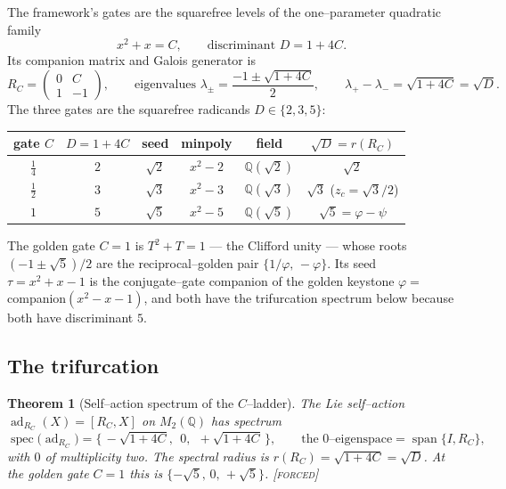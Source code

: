 \documentclass[11pt]{article}
\theoremstyle{plain}
\newtheorem{theorem}{Theorem}[section]
\theoremstyle{definition}
\theoremstyle{remark}
\newcommand{\forced}{\textcolor{forcedc}{\textsc{[forced]}}}
\newcommand{\Q}{\mathbb{Q}}
\begin{document}
The framework's gates are the squarefree levels of the one--parameter quadratic family
\begin{equation}\label{eq:gengate}
x^2 + x = C, \qquad \text{discriminant } D = 1+4C .
\end{equation}
Its companion matrix and Galois generator is
\begin{equation}\label{eq:companion}
R_C = \begin{pmatrix} 0 & C \\ 1 & -1 \end{pmatrix}, \qquad \text{eigenvalues } \lambda_\pm = \frac{-1\pm\sqrt{1+4C}}{2}, \qquad \lambda_+ - \lambda_- = \sqrt{1+4C}=\sqrt D .
\end{equation}
The three gates are the squarefree radicands $D\in\{2,3,5\}$:

\begin{center}
\renewcommand{\arraystretch}{1.3}
\begin{tabular}{@{}cccccc@{}}
\toprule
gate $C$ & $D=1+4C$ & seed & minpoly & field & $\sqrt D = r(R_C)$ \\
\midrule
$\tfrac14$ & $2$ & $\sqrt2$ & $x^2-2$ & $\Q(\sqrt2)$ & $\sqrt2$ \\
$\tfrac12$ & $3$ & $\sqrt3$ & $x^2-3$ & $\Q(\sqrt3)$ & $\sqrt3$ \quad ($z_c=\sqrt3/2$) \\
$1$ & $5$ & $\sqrt5$ & $x^2-5$ & $\Q(\sqrt5)$ & $\sqrt5 = \varphi-\psi$ \\
\bottomrule
\end{tabular}
\end{center}

\noindent The golden gate $C=1$ is $T^2+T=1$ --- the Clifford unity --- whose roots $(-1\pm\sqrt5)/2$ are the reciprocal--golden pair $\{1/\varphi,\,-\varphi\}$. Its seed $\tau = x^2+x-1$ is the conjugate--gate companion of the golden keystone $\varphi=\,$companion$(x^2-x-1)$, and both have the trifurcation spectrum below because both have discriminant $5$.

\subsection{The trifurcation}

\begin{theorem}[Self--action spectrum of the $C$--ladder]\label{prop:trifurcation}
The Lie self--action $\operatorname{ad}_{R_C}(X) = [R_C, X]$ on $M_2(\Q)$ has spectrum
\begin{equation}\label{eq:trifurcation}
\operatorname{spec}\bigl(\operatorname{ad}_{R_C}\bigr) = \bigl\{\, -\sqrt{1+4C},\ \ 0,\ \ +\sqrt{1+4C} \,\bigr\}, \qquad \text{the } 0\text{--eigenspace}=\operatorname{span}\{I, R_C\},
\end{equation}
with $0$ of multiplicity two. The spectral radius is $r(R_C)=\sqrt{1+4C}=\sqrt D$. At the golden gate $C=1$ this is $\{-\sqrt5,\,0,\,+\sqrt5\}$. \forced
\end{theorem}
\end{document}
